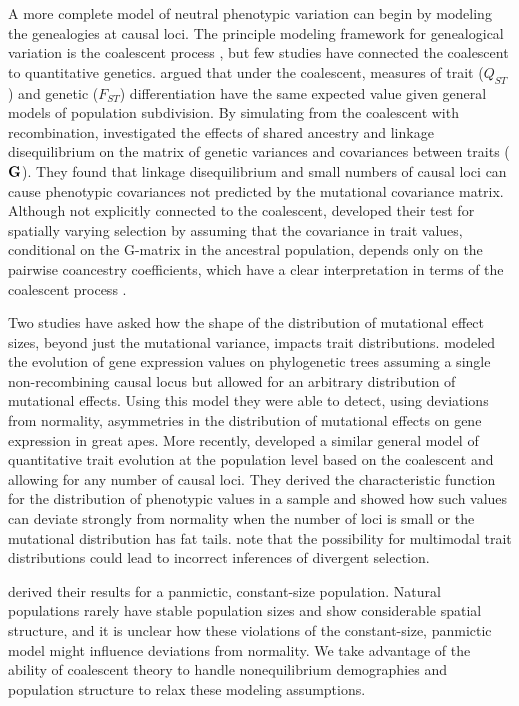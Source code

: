 A more complete model of neutral phenotypic variation can begin by modeling the
genealogies at causal loci. The principle modeling framework for genealogical
variation is the coalescent process \citep{Wakeley2008}, but few studies have
connected the coalescent to quantitative genetics. \citet{Whitlock1999} argued
that under the coalescent, measures of trait ($Q_{ST}$) and genetic ($F_{ST}$)
differentiation have the same expected value given general models of population
subdivision. By simulating from the coalescent with recombination,
\citet{Griswold2007} investigated the effects of shared ancestry and linkage
disequilibrium on the matrix of genetic variances and covariances between traits
($\mbox{\textbf{G}}$). They found that linkage disequilibrium and small numbers
of causal loci can cause phenotypic covariances not predicted by the mutational
covariance matrix. Although not explicitly connected to the coalescent,
\citet{Ovaskainen2011} developed their test for spatially varying selection by
assuming that the covariance in trait values, conditional on the G-matrix in the
ancestral population, depends only on the pairwise coancestry coefficients,
which have a clear interpretation in terms of the coalescent process
\citep{Slatkin1991}.

Two studies have asked how the shape of the distribution of mutational effect
sizes, beyond just the mutational variance, impacts trait
distributions. \citet{Khaitovich2005} modeled the evolution of gene expression
values on phylogenetic trees assuming a single non-recombining causal locus but
allowed for an arbitrary distribution of mutational effects. Using this model
they were able to detect, using deviations from normality, asymmetries in the
distribution of mutational effects on gene expression in great apes. More
recently, \citet{Schraiber2015} developed a similar general model of
quantitative trait evolution at the population level based on the coalescent and
allowing for any number of causal loci. They derived the characteristic function
for the distribution of phenotypic values in a sample and showed how such values
can deviate strongly from normality when the number of loci is small or the
mutational distribution has fat tails. \citet{Schraiber2015} note that the
possibility for multimodal trait distributions could lead to incorrect
inferences of divergent selection.

\citet{Schraiber2015} derived their results for a panmictic, constant-size
population. Natural populations rarely have stable population sizes and show
considerable spatial structure, and it is unclear how these violations of the
constant-size, panmictic model might influence deviations from normality. We
take advantage of the ability of coalescent theory to handle nonequilibrium
demographies and population structure to relax these modeling assumptions.

